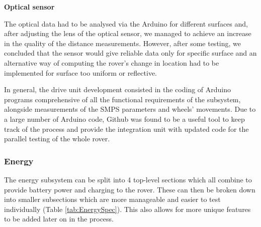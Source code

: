 \documentclass[10pt,twoside]{article}
\begin{document}
\textbf{Optical sensor}

The optical data had to be analysed via the Arduino for different surfaces and, after adjusting the lens of the optical sensor, we managed to achieve an increase in the quality of the distance measurements. However, after some testing, we concluded that the sensor would give reliable data only for specific surface and an alternative way of computing the rover’s change in location had to be implemented for surface too uniform or reflective. 

In general, the drive unit development consisted in the coding of Arduino programs comprehensive of all the functional requirements of the subsystem, alongside measurements of the SMPS parameters and wheels’ movements. Due to a large number of Arduino code, Github was found to be a useful tool to keep track of the process and provide the integration unit with updated code for the parallel testing of the whole rover. 

\newpage

\subsubsection{Energy}
The energy subsystem can be split into 4 top-level sections which all combine to provide battery power and charging to the rover. These can then be broken down into smaller subsections which are more manageable and easier to test individually (Table \ref{tab:EnergySpec}). This also allows for more unique features to be added later on in the process. 
\end{document}
